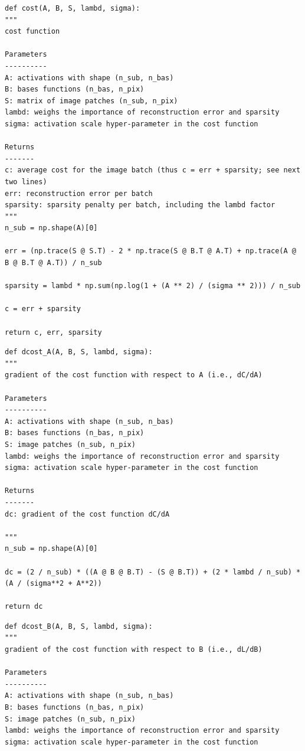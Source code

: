 \documentclass[11pt, twocolumn]{article}
\begin{document}
\begin{appendix}\label{sec:appendix}
\begin{lstlisting}
def cost(A, B, S, lambd, sigma):
"""
cost function

Parameters
----------
A: activations with shape (n_sub, n_bas)
B: bases functions (n_bas, n_pix)
S: matrix of image patches (n_sub, n_pix)
lambd: weighs the importance of reconstruction error and sparsity
sigma: activation scale hyper-parameter in the cost function
    
Returns
-------
c: average cost for the image batch (thus c = err + sparsity; see next two lines)
err: reconstruction error per batch
sparsity: sparsity penalty per batch, including the lambd factor
"""
n_sub = np.shape(A)[0]
    
err = (np.trace(S @ S.T) - 2 * np.trace(S @ B.T @ A.T) + np.trace(A @ B @ B.T @ A.T)) / n_sub

sparsity = lambd * np.sum(np.log(1 + (A ** 2) / (sigma ** 2))) / n_sub

c = err + sparsity

return c, err, sparsity
\end{lstlisting}

\begin{lstlisting}
def dcost_A(A, B, S, lambd, sigma):
"""
gradient of the cost function with respect to A (i.e., dC/dA)

Parameters
----------
A: activations with shape (n_sub, n_bas)
B: bases functions (n_bas, n_pix)
S: image patches (n_sub, n_pix)
lambd: weighs the importance of reconstruction error and sparsity
sigma: activation scale hyper-parameter in the cost function

Returns
-------
dc: gradient of the cost function dC/dA

"""
n_sub = np.shape(A)[0]

dc = (2 / n_sub) * ((A @ B @ B.T) - (S @ B.T)) + (2 * lambd / n_sub) * (A / (sigma**2 + A**2))

return dc
\end{lstlisting}

\begin{lstlisting}
def dcost_B(A, B, S, lambd, sigma):
"""
gradient of the cost function with respect to B (i.e., dL/dB)

Parameters
----------
A: activations with shape (n_sub, n_bas)
B: bases functions (n_bas, n_pix)
S: image patches (n_sub, n_pix)
lambd: weighs the importance of reconstruction error and sparsity
sigma: activation scale hyper-parameter in the cost function


\end{lstlisting}
\end{appendix}
\end{document}

